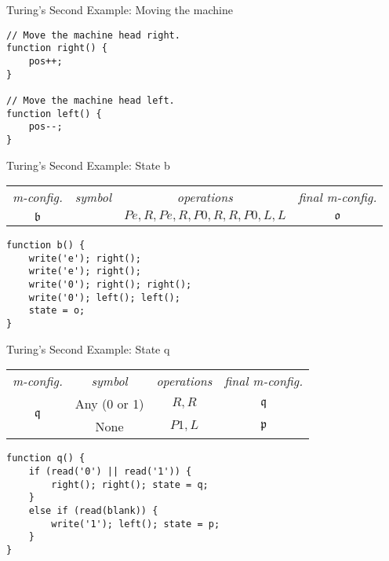 \documentclass[dvipsnames, hidelinks]{beamer}
\begin{document}
\begin{frame}[fragile]{Turing's Second Example: Moving the machine}
\begin{verbatim}
// Move the machine head right.
function right() {
	pos++;
}

// Move the machine head left.
function left() {
	pos--;
}
\end{verbatim}
\end{frame}


\begin{frame}[fragile]{Turing's Second Example: State b}
\begin{table}
    \centering
    \begin{tabular}{cccc}
      \emph{m-config.}  & \emph{symbol}  & \emph{operations} & \emph{final m-config.} \\
      $\mathfrak{b}$ & & $Pe,R,Pe,R,P0,R,R,P0,L,L$  & $\mathfrak{o}$
    \end{tabular}
  \end{table}

\begin{verbatim}
function b() {
	write('e'); right();
	write('e'); right();
	write('0'); right(); right();
	write('0'); left(); left();
	state = o;
}
\end{verbatim}
\end{frame}


\begin{frame}[fragile]{Turing's Second Example: State q}
\begin{table}
    \centering
    \begin{tabular}{cccc}
      \emph{m-config.}  & \emph{symbol}  & \emph{operations} & \emph{final m-config.} \\
      \multirow{2}{*}{$\mathfrak{q}$} & Any (0 or 1) & $R,R$ & $\mathfrak{q}$ \\
      & None & $P1,L$ & $\mathfrak{p}$ \\
    \end{tabular}
  \end{table}

\begin{verbatim}
function q() {
	if (read('0') || read('1')) {
		right(); right(); state = q;
	}
	else if (read(blank)) {
		write('1'); left(); state = p;
	}
}
\end{verbatim}
\end{frame}
\end{document}
